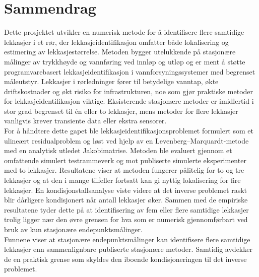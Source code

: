 \chapter*{Sammendrag}

Dette prosjektet utvikler en numerisk metode for å identifisere flere samtidige lekkasjer i et rør, der lekkasjeidentifikasjon omfatter både lokalisering og estimering av lekkasjestørrelse. Metoden bygger utelukkende på stasjonære målinger av trykkhøyde og vannføring ved innløp og utløp og er ment å støtte programvarebasert lekkasjeidentifikasjon i vannforsyningssystemer med begrenset måleutstyr. Lekkasjer i rørledninger fører til betydelige vanntap, økte driftskostnader og økt risiko for infrastrukturen, noe som gjør praktiske metoder for lekkasjeidentifikasjon viktige. Eksisterende stasjonære metoder er imidlertid i stor grad begrenset til én eller to lekkasjer, mens metoder for flere lekkasjer vanligvis krever transiente data eller ekstra sensorer.\\

For å håndtere dette gapet ble lekkasjeidentifikasjonsproblemet formulert som et ulineært residualproblem og løst ved hjelp av en Levenberg--Marquardt-metode med en analytisk utledet Jakobimatrise. Metoden ble evaluert gjennom et omfattende simulert testrammeverk og mot publiserte simulerte eksperimenter med to lekkasjer. Resultatene viser at metoden fungerer pålitelig for to og tre lekkasjer og at den i mange tilfeller fortsatt kan gi nyttig lokalisering for fire lekkasjer. En kondisjonstallsanalyse viste videre at det inverse problemet raskt blir dårligere kondisjonert når antall lekkasjer øker. Sammen med de empiriske resultatene tyder dette på at identifisering av fem eller flere samtidige lekkasjer trolig ligger nær den øvre grensen for hva som er numerisk gjennomførbart ved bruk av kun stasjonære endepunktsmålinger.\\

Funnene viser at stasjonære endepunktsmålinger kan identifisere flere samtidige lekkasjer enn sammenlignbare publiserte stasjonære metoder. Samtidig avdekker de en praktisk grense som skyldes den iboende kondisjoneringen til det inverse problemet.